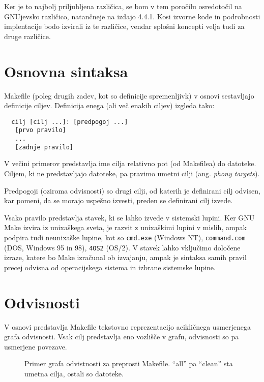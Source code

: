 \documentclass[notitlepage]{report}
\begin{document}
Ker je to najbolj priljubljena različica, se bom v tem poročilu
osredotočil na GNUjevsko različico, natančneje na izdajo 4.4.1. Kosi
izvorne kode in podrobnosti implentacije bodo izvirali iz te
različice, vendar splošni koncepti velja tudi za druge različice.

\section*{Osnovna sintaksa}

Makefile (poleg drugih zadev, kot so definicije spremenljivk) v osnovi
sestavljajo definicije ciljev. Definicija enega (ali več enakih
ciljev) izgleda tako:

\begin{verbatim}
  cilj [cilj ...]: [predpogoj ...]
   [prvo pravilo]
   ...
   [zadnje pravilo]
\end{verbatim}

V večini primerov predstavlja ime cilja relativno pot (od Makefilea)
do datoteke. Ciljem, ki ne predstavljajo datoteke, pa pravimo umetni
cilji (ang. \textit{phony targets}).

Predpogoji (oziroma odvisnosti) so drugi cilji, od katerih je
definirani cilj odvisen, kar pomeni, da se morajo uspešno izvesti,
preden se definirani cilj izvede.

Vsako pravilo predstavlja stavek, ki se lahko izvede v sistemski
lupini. Ker GNU Make izvira iz unixaškega sveta, je razvit z
unixaškimi lupini v mislih, ampak podpira tudi neunixaške lupine, kot
so \verb|cmd.exe| (Windows NT), \verb|command.com| (DOS, Windows 95 in
98), \verb|4OS2| (OS/2). V stavek lahko vključimo določene izraze,
katere bo Make izračunal ob izvajanju, ampak je sintaksa samih pravil
precej odvisna od operacijskega sistema in izbrane sistemske lupine.

\section*{Odvisnosti}

V osnovi predstavlja Makefile tekstovno reprezentacijo acikličnega
usmerjenega grafa odvisnosti. Vsak cilj predstavlja eno vozlišče v
grafu, odvisnosti so pa usmerjene povezave.


\begin{figure}[H]
  \caption{Primer grafa odvistnosti za preprosti Makefile. ``all'' pa
    ``clean'' sta umetna cilja, ostali so datoteke.}

\end{figure}
\end{document}
